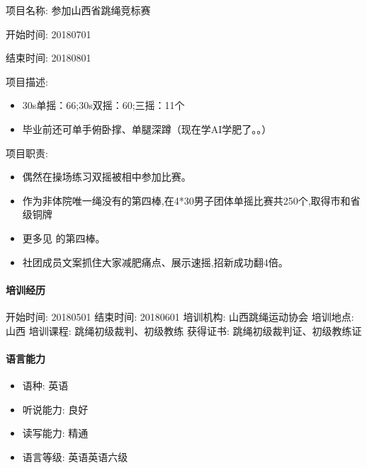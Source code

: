 \documentclass[letterpaper,10pt,english]{sphinxmanual}
\begin{document}
项目名称: 参加山西省跳绳竞标赛

开始时间: 2018\sphinxhyphen{}07\sphinxhyphen{}01

结束时间: 2018\sphinxhyphen{}08\sphinxhyphen{}01

项目描述:
\begin{itemize}
\item {} 
30s单摇：66;30s双摇：60;三摇：11个

\item {} 
毕业前还可单手俯卧撑、单腿深蹲（现在学AI学肥了。。）

\end{itemize}

项目职责:
\begin{itemize}
\item {} 
偶然在操场练习双摇被相中参加比赛。

\item {} 
作为非体院唯一绳没有的第四棒,在4*30男子团体单摇比赛共250个,取得市和省级铜牌

\item {} 
更多见 
的第四棒。

\item {} 
社团成员文案抓住大家减肥痛点、展示速摇,招新成功翻4倍。

\end{itemize}


\paragraph{培训经历}
\label{\detokenize{get_started:id5}}
开始时间: 2018\sphinxhyphen{}05\sphinxhyphen{}01 结束时间: 2018\sphinxhyphen{}06\sphinxhyphen{}01 培训机构: 山西跳绳运动协会
培训地点: 山西 培训课程: 跳绳初级裁判、初级教练 获得证书:
跳绳初级裁判证、初级教练证


\paragraph{语言能力}
\label{\detokenize{get_started:id6}}\begin{itemize}
\item {} 
语种: 英语

\item {} 
听说能力: 良好

\item {} 
读写能力: 精通

\item {} 
语言等级: 英语\sphinxhyphen{}英语六级

\end{itemize}
\end{document}
